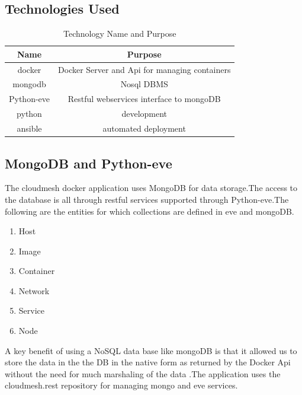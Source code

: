 \documentclass[9pt,twocolumn,twoside]{../../styles/osajnl}
\begin{document}
\subsection{Technologies Used}
\begin{table}[H]
\centering
\begin{tabular}{|c c|} 
 \hline
 Name & Purpose \\ 
 \hline
 docker \cite{www-Docker} & Docker Server and Api for managing containers \\ 
 mongodb \cite{www-MongoDB} & Nosql DBMS \\ 
 Python-eve    \cite{www-Pythoneve} & Restful webservices interface to mongoDB \\ 
 python \cite{www-Python} & development  \\ 
 ansible \cite{www-Ansible} & automated deployment \\ [1ex] 
\hline
\end{tabular}
\caption{Technology Name and Purpose}
\label{table:1}
\end{table}

\subsection{MongoDB and Python-eve}

The cloudmesh docker application uses MongoDB\cite{www-MongoDB} for data storage.The access to the database is all through
restful services supported through Python-eve\cite{www-Pythoneve}.The following are the entities for which collections are defined 
in eve and mongoDB.

\begin{enumerate}
\item Host
\item Image
\item Container
\item Network
\item Service
\item Node
\end{enumerate}
A key benefit of using a NoSQL data base like mongoDB is that it allowed us to store the data in the the DB in the native form as returned by the Docker Api without the need for much marshaling of the data .The application uses the cloudmesh.rest repository for managing mongo and eve services.
\end{document}
